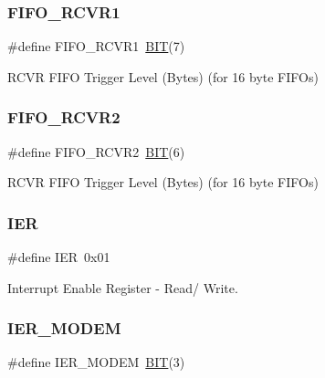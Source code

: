 \subsubsection{\texorpdfstring{F\+I\+F\+O\+\_\+\+R\+C\+V\+R1}{FIFO\_RCVR1}}
{\footnotesize\ttfamily \#define F\+I\+F\+O\+\_\+\+R\+C\+V\+R1~\hyperlink{group___serial_ga3a8ea58898cb58fc96013383d39f482c}{B\+IT}(7)}



R\+C\+VR F\+I\+FO Trigger Level (Bytes) (for 16 byte F\+I\+F\+Os) 

\hypertarget{group___serial_ga10947413fec5094d1e649a4764ce752a}{}\label{group___serial_ga10947413fec5094d1e649a4764ce752a} 
\subsubsection{\texorpdfstring{F\+I\+F\+O\+\_\+\+R\+C\+V\+R2}{FIFO\_RCVR2}}
{\footnotesize\ttfamily \#define F\+I\+F\+O\+\_\+\+R\+C\+V\+R2~\hyperlink{group___serial_ga3a8ea58898cb58fc96013383d39f482c}{B\+IT}(6)}



R\+C\+VR F\+I\+FO Trigger Level (Bytes) (for 16 byte F\+I\+F\+Os) 

\hypertarget{group___serial_ga3e27fa35f9febccdc4a0c28a5c8cffbb}{}\label{group___serial_ga3e27fa35f9febccdc4a0c28a5c8cffbb} 
\subsubsection{\texorpdfstring{I\+ER}{IER}}
{\footnotesize\ttfamily \#define I\+ER~0x01}



Interrupt Enable Register -\/ Read/ Write. 

\hypertarget{group___serial_gae06fe45719e515d431ec3b0e9356516d}{}\label{group___serial_gae06fe45719e515d431ec3b0e9356516d} 
\subsubsection{\texorpdfstring{I\+E\+R\+\_\+\+M\+O\+D\+EM}{IER\_MODEM}}
{\footnotesize\ttfamily \#define I\+E\+R\+\_\+\+M\+O\+D\+EM~\hyperlink{group___serial_ga3a8ea58898cb58fc96013383d39f482c}{B\+IT}(3)}



